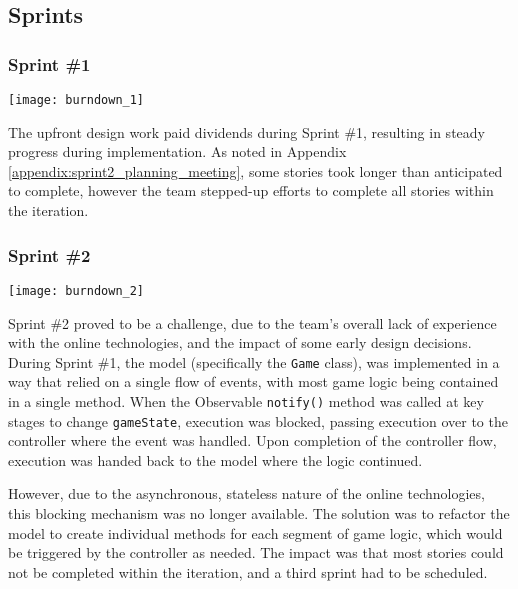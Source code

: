 \subsection{Sprints}

\subsubsection{Sprint \#1}

\begin{center}
	\texttt{[image: burndown\_1]}
	\label{figure:burndown_1}
\end{center}

The upfront design work paid dividends during Sprint \#1, resulting in steady progress during implementation.
As noted in Appendix \ref{appendix:sprint2_planning_meeting}, some stories took longer than anticipated to complete, however the team stepped-up efforts to complete all stories within the iteration.

\subsubsection{Sprint \#2}

\begin{center}
	\texttt{[image: burndown\_2]}
	\label{figure:burndown_2}
\end{center}

Sprint \#2 proved to be a challenge, due to the team's overall lack of experience with the online technologies, and the impact of some early design decisions.
During Sprint \#1, the model (specifically the \texttt{Game} class), was implemented in a way that relied on a single flow of events, with most game logic being contained in a single method. When the Observable \texttt{notify()} method was called at key stages to change \texttt{gameState}, execution was blocked, passing execution over to the controller where the event was handled. Upon completion of the controller flow, execution was handed back to the model where the logic continued.

However, due to the asynchronous, stateless nature of the online technologies, this blocking mechanism was no longer available.
The solution was to refactor the model to create individual methods for each segment of game logic, which would be triggered by the controller as needed.
The impact was that most stories could not be completed within the iteration, and a third sprint had to be scheduled.


